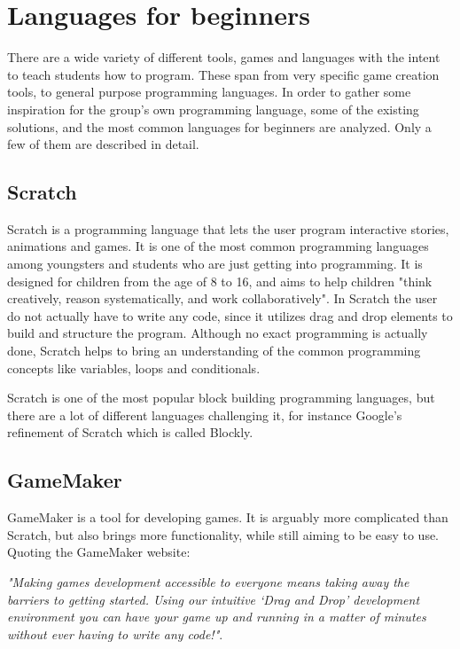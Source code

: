 \section{Languages for beginners}

There are a wide variety of different tools, games and languages with the intent to teach students how to program. 
These span from very specific game creation tools, to general purpose programming languages. 
In order to gather some inspiration for the group's own programming language, some of the existing solutions, and the most common languages for beginners are analyzed.
Only a few of them are described in detail.

\subsection{Scratch}
\label{sec:Scratch}
Scratch is a programming language that lets the user program interactive stories, animations and games. 
It is one of the most common programming languages among youngsters and students who are just getting into programming. 
It is designed for children from the age of 8 to 16, and aims to help children "think creatively, reason systematically, and work collaboratively". 
In Scratch the user do not actually have to write any code, since it utilizes drag and drop elements to build and structure the program. 
Although no exact programming is actually done, Scratch helps to bring an understanding of the common programming concepts like variables, loops and conditionals\cite{ScratchWebsite}.

Scratch is one of the most popular block building programming languages, but there are a lot of different languages challenging it, for instance Google's refinement of Scratch which is called Blockly\cite{Blockly}.

\subsection{GameMaker}
GameMaker is a tool for developing games. 
It is arguably more complicated than Scratch, but also brings more functionality, while still aiming to be easy to use. 
Quoting the GameMaker website: 

\textit{"Making games development accessible to everyone means taking away the barriers to getting started. 
Using our intuitive ‘Drag and Drop’ development environment you can have your game up and running in a matter of minutes without ever having to write any code!"}\cite{GameMaker}.
 
